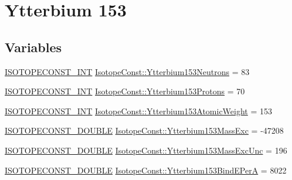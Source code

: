 \hypertarget{group___isotope_const-_ytterbium-_yb153}{}\section{Ytterbium 153}
\label{group___isotope_const-_ytterbium-_yb153}
\subsection*{Variables}
\begin{DoxyCompactItemize}
\item 
\mbox{\hyperlink{group___isotope_const-_macros_ga5f18360b3e99483a35c32d789e62621c}{I\+S\+O\+T\+O\+P\+E\+C\+O\+N\+S\+T\+\_\+\+I\+NT}} \mbox{\hyperlink{group___isotope_const-_ytterbium-_yb153_ga4d6a3eeea4799299f5404d9f3720a98d}{Isotope\+Const\+::\+Ytterbium153\+Neutrons}} = 83
\item 
\mbox{\hyperlink{group___isotope_const-_macros_ga5f18360b3e99483a35c32d789e62621c}{I\+S\+O\+T\+O\+P\+E\+C\+O\+N\+S\+T\+\_\+\+I\+NT}} \mbox{\hyperlink{group___isotope_const-_ytterbium-_yb153_ga4ad35a76db32188f08efd2da1fc6dd08}{Isotope\+Const\+::\+Ytterbium153\+Protons}} = 70
\item 
\mbox{\hyperlink{group___isotope_const-_macros_ga5f18360b3e99483a35c32d789e62621c}{I\+S\+O\+T\+O\+P\+E\+C\+O\+N\+S\+T\+\_\+\+I\+NT}} \mbox{\hyperlink{group___isotope_const-_ytterbium-_yb153_ga4e45c2a39376208e4ed08a788b041fee}{Isotope\+Const\+::\+Ytterbium153\+Atomic\+Weight}} = 153
\item 
\mbox{\hyperlink{group___isotope_const-_macros_ga8f45a7272ce02c0b4c65c44636ed719a}{I\+S\+O\+T\+O\+P\+E\+C\+O\+N\+S\+T\+\_\+\+D\+O\+U\+B\+LE}} \mbox{\hyperlink{group___isotope_const-_ytterbium-_yb153_ga103284dee0544ffceca4ef93b45bcc4b}{Isotope\+Const\+::\+Ytterbium153\+Mass\+Exc}} = -\/47208
\item 
\mbox{\hyperlink{group___isotope_const-_macros_ga8f45a7272ce02c0b4c65c44636ed719a}{I\+S\+O\+T\+O\+P\+E\+C\+O\+N\+S\+T\+\_\+\+D\+O\+U\+B\+LE}} \mbox{\hyperlink{group___isotope_const-_ytterbium-_yb153_gabf0ab06ec4cd47f1843e01db366bfe90}{Isotope\+Const\+::\+Ytterbium153\+Mass\+Exc\+Unc}} = 196
\item 
\mbox{\hyperlink{group___isotope_const-_macros_ga8f45a7272ce02c0b4c65c44636ed719a}{I\+S\+O\+T\+O\+P\+E\+C\+O\+N\+S\+T\+\_\+\+D\+O\+U\+B\+LE}} \mbox{\hyperlink{group___isotope_const-_ytterbium-_yb153_ga244db6f1373c663aa7ecdd5e963d500e}{Isotope\+Const\+::\+Ytterbium153\+Bind\+E\+PerA}} = 8022
\item 

\end{DoxyCompactItemize}

